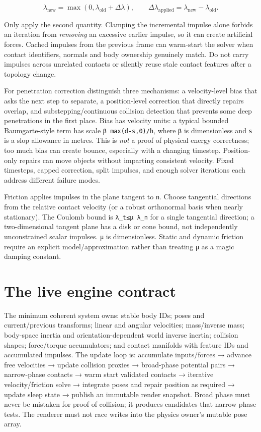 \[
\lambda_{\mathrm{new}}=\max(0,\lambda_{\mathrm{old}}+\Delta\lambda),\qquad
\Delta\lambda_{\mathrm{applied}}=\lambda_{\mathrm{new}}-\lambda_{\mathrm{old}}.
\]

Only apply the second quantity. Clamping the incremental impulse alone forbids an iteration from \emph{removing} an excessive earlier impulse, so it can create artificial forces. Cached impulses from the previous frame can warm-start the solver when contact identifiers, normals and body ownership genuinely match. Do not carry impulses across unrelated contacts or silently reuse stale contact features after a topology change.

For penetration correction distinguish three mechanisms: a velocity-level bias that asks the next step to separate, a position-level correction that directly repairs overlap, and substepping/continuous collision detection that prevents some deep penetrations in the first place. Bias has velocity units: a typical bounded Baumgarte-style term has scale \texttt{β\ max(d-s,0)/h}, where \texttt{β} is dimensionless and \texttt{s} is a slop allowance in metres. This is \emph{not} a proof of physical energy correctness; too much bias can create bounce, especially with a changing timestep. Position-only repairs can move objects without imparting consistent velocity. Fixed timesteps, capped correction, split impulses, and enough solver iterations each address different failure modes.

Friction applies impulses in the plane tangent to \texttt{n}. Choose tangential directions from the relative contact velocity (or a robust orthonormal basis when nearly stationary). The Coulomb bound is \texttt{\textbar{}λ\_t\textbar{}≤μ\ λ\_n} for a single tangential direction; a two-dimensional tangent plane has a disk or cone bound, not independently unconstrained scalar impulses. \texttt{μ} is dimensionless. Static and dynamic friction require an explicit model/approximation rather than treating \texttt{μ} as a magic damping constant.

\section{The live engine contract}\label{02-foundations-ii-ch039-the-live-engine-contract}

The minimum coherent system owns: stable body IDs; poses and current/previous transforms; linear and angular velocities; mass/inverse mass; body-space inertia and orientation-dependent world inverse inertia; collision shapes; force/torque accumulators; and contact manifolds with feature IDs and accumulated impulses. The update loop is: accumulate inputs/forces → advance free velocities → update collision proxies → broad-phase potential pairs → narrow-phase contacts → warm start validated contacts → iterative velocity/friction solve → integrate poses and repair position as required → update sleep state → publish an immutable render snapshot. Broad phase must never be mistaken for proof of collision; it produces candidates that narrow phase tests. The renderer must not race writes into the physics owner's mutable pose array.

